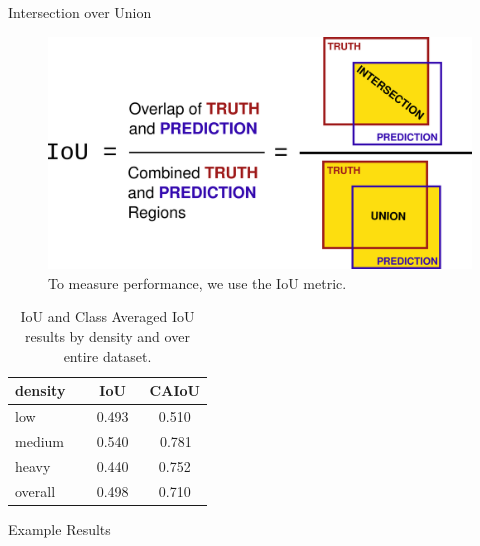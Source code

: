 \documentclass[final,16pt]{beamer}
\newlength{\colwidth}
\begin{document}
\begin{frame}[t]
\begin{columns}[t]
\begin{column}{\colwidth}
  \begin{block}{Intersection over Union}
    \begin{minipage}{.6\textwidth}
        \begin{figure}
            \includegraphics[width=.8\textwidth]{figures/IoU.png}
            \caption{To measure performance, we use the IoU metric.}
        \end{figure}
    \end{minipage}%
    \begin{minipage}{.4\textwidth}
        \begin{table}
          \centering
          \begin{tabular}{l c c }
            \toprule
            \textbf{density} & \textbf{IoU} & \textbf{CAIoU} \\
            \midrule
            low & 0.493 &  0.510 \\
            medium \,\,\, & \,\,\,0.540\,\,\, & \,\,\,0.781\,\,\\
            heavy & 0.440  & 0.752\\
            overall & 0.498 & 0.710\\
            \bottomrule
          \end{tabular}
          \caption{IoU and Class Averaged IoU results by density and over entire dataset.}
        \end{table}
    \end{minipage}
  \end{block}


  \vspace{-1cm}
  \begin{block}{Example Results}


\end{block}
\end{column}
\end{columns}
\end{frame}
\end{document}
